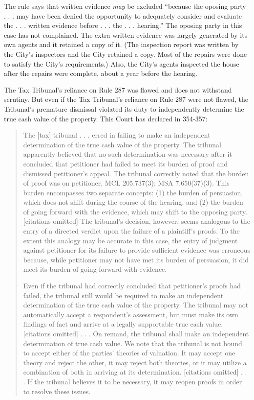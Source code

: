 \documentclass[12pt,\documentclassflag]{michiganCourtOfAppealsBrief}
\begin{document}
The rule says that written evidence \emph{may} be excluded ``because the oposing party . . . may have been denied the opportunity to adequately consider and evaluate the . . . written evidence before . . . the . . .  hearing.'' The oposing party in this case has not complained. The extra written evidence was largely generated by its own agents and it retained a copy of it. (The inspection report was written by the City's inspectors and the City retained a copy. Most of the repairs were done to satisfy the City's requirements.) Also, the City's agents inspected the house after the repairs were complete, about a year before the hearing.

The Tax Tribunal's reliance on Rule 287 was flawed and does not withstand scrutiny. But even if the Tax Tribunal's reliance on Rule 287 were not flawed, the Tribunal's premature dismissal violated its duty to independently determine the true cash value of the property. This Court has declared in \cite{Jones & Laughlin}{354-357}:

\begin{quote}
The [tax] tribunal . . . erred in failing to make an independent determination of the true cash value of the property. The tribunal apparently believed that no such determination was necessary after it concluded that petitioner had failed to meet its burden of proof and dismissed petitioner's appeal. The tribunal correctly noted that the burden of proof was on petitioner, MCL 205.737(3); MSA 7.650(37)(3). This burden encompasses two separate concepts: (1) the burden of persuasion, which does not shift during the course of the hearing; and (2) the burden of going forward with the evidence, which may shift to the opposing party. [citations omitted] The tribunal's decision, however, seems analogous to the entry of a directed verdict upon the failure of a plaintiff's proofs. To the extent this analogy may be accurate in this case, the entry of judgment against petitioner for its failure to provide sufficient evidence was erroneous because, while petitioner may not have met its burden of persuasion, it did meet its burden of going forward with evidence.

  Even if the tribunal had correctly concluded that petitioner's proofs had failed, the tribunal still would be required to make an independent determination of the true cash value of the property. The tribunal may not automatically accept a respondent's assessment, but must make its own findings of fact and arrive at a legally supportable true cash value. [citations omitted] . . . On remand, the tribunal shall make an independent determination of true cash value. We note that the tribunal is not bound to accept either of the parties' theories of valuation. It may accept one theory and reject the other, it may reject both theories, or it may utilize a combination of both in arriving at its determination. [citations omitted] . . . If the tribunal believes it to be necessary, it may reopen proofs in order to resolve these issues.
\end{quote}
\end{document}
